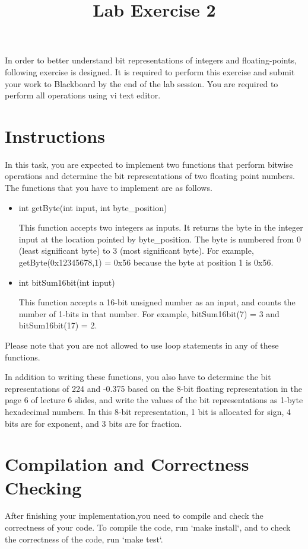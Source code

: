 \documentclass[twoside,11pt]{article}
\newcommand\assignmentNumber{2}
\begin{document}
    \title{Lab Exercise \assignmentNumber}
    \maketitle
In order to better understand bit representations of integers and floating-points, following exercise is designed. It is required to perform this exercise and submit your work to Blackboard by the end of the lab session. You are required to perform all operations using vi text editor.

\section{Instructions}

In this task, you are expected to implement two functions that perform bitwise operations and 
determine the bit representations of two floating point numbers. The functions that you have to 
implement are as follows.

\begin{itemize}
\item int getByte(int input, int byte\_position)

This function accepts two integers as inputs. It returns the byte in the integer input at the location pointed by byte\_position. The byte is numbered from 0 (least significant byte) to 3 (most significant byte). For example, getByte(0x12345678,1) = 0x56 because the byte at position 1 is 0x56.

\item int bitSum16bit(int input)

This function accepts a 16-bit unsigned number as an input, and counts the number of 1-bits in 
that number. For example, bitSum16bit(7) = 3 and bitSum16bit(17) = 2.

\end{itemize}

Please note that you are not allowed to use loop statements in any of these functions. 

In addition to writing these functions, you also have to determine the bit representations of 
224 and -0.375 based on the 8-bit floating representation in the page 6 of lecture 6 slides, 
and write the values of the bit representations as 1-byte hexadecimal numbers. In this 8-bit 
representation, 1 bit is allocated for sign, 4 bits are for exponent, and 3 bits are for fraction.

\section{Compilation and Correctness Checking}

After finishing your implementation,you need to compile and check the correctness of your code. To compile the code, run `make install`, and to check the correctness of the code, run `make test`.

\newpage
\end{document}
